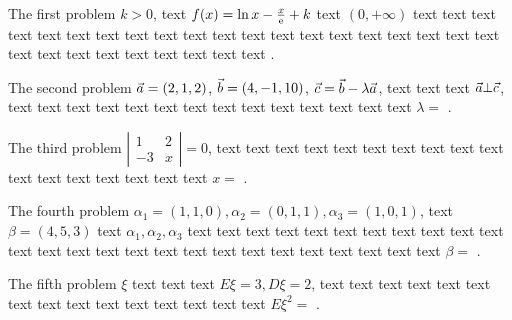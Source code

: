 \documentclass[12pt,most]{randexam}
\begin{document}
\renewcommand{\examtitle}{Math 1906 Final Exam}
\renewcommand{\examdate}{2018-06-28}
\renewcommand{\examvariant}{A}

\makehead %

\gradetable



\begin{problem}[points=2]
The first problem $k>0$, text $f(x)=\ln x-\frac{x}{\mathrm{e}}+k$ text $(0,+\infty)$
text text text text text text text text text text text text text text text text
text text text text text text text text text text text text text .
\end{problem}

\bigskip

\begin{problem}[points=1]
The second problem $\vec{a}=(2,1,2)$, $\vec{b}=(4,-1,10)$, $\vec{c}=\vec{b}-\lambda\vec{a}$,
text text text $\vec{a}\bot\vec{c}$, text text text text text text text text text
text text text text text $\lambda=$ .
\end{problem}

\bigskip

\begin{problem}
The third problem $\left|\begin{array}{cc}
  1  & 2\\
  -3 & x
\end{array}\right|=0$, text text text text text text text text
text text text text text text text text text $x=$ .
\end{problem}

\bigskip

\begin{problem}
The fourth problem $\alpha_1=(1,1,0), \alpha_2=(0,1,1), \alpha_3=(1,0,1)$,
text $\beta=(4, 5, 3)$ text $\alpha_1, \alpha_2, \alpha_3$ text text text text 
text text text text text text text text text text text text text text text text
text text text text text text $\beta=$ .
\end{problem}

\bigskip

\begin{problem}%
The fifth problem $\xi$ text text text $E\xi=3, D\xi=2$, text text text text text
text text text text text text text text text text $E\xi^2=$ .
\end{problem}
\end{document}
